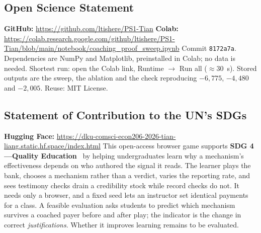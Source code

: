 {\small
\subsection*{Open Science Statement}
\textbf{GitHub:} \url{https://github.com/ltishere/PS1-Tian}\quad
\textbf{Colab:} \url{https://colab.research.google.com/github/ltishere/PS1-Tian/blob/main/notebook/coaching_proof_sweep.ipynb}\quad
Commit \texttt{8172a7a}. Dependencies are NumPy and Matplotlib,
preinstalled in Colab; no data is needed. Shortest run: open the Colab
link, Runtime $\rightarrow$ Run all ($\approx$30~s). Stored outputs are
the sweep, the ablation and the check reproducing $-6{,}775$, $-4{,}480$
and $-2{,}005$. Reuse: MIT License.

\subsection*{Statement of Contribution to the UN's SDGs}
\textbf{Hugging Face:}
\url{https://dku-comsci-econ206-2026-tian-liang.static.hf.space/index.html}\quad
This open-access browser game supports \textbf{SDG 4---Quality
Education}~\cite{un2015sdg4} by helping undergraduates learn why a
mechanism's effectiveness depends on who authored the signal it reads.
The learner plays the bank, chooses a mechanism rather than a verdict, varies
the reporting rate, and sees testimony checks drain a credibility stock
while record checks do not. It needs only a browser, and a fixed seed lets
an instructor set identical payments for a class. A feasible evaluation
asks students to predict which mechanism survives a coached payer before
and after play; the indicator is the change in correct
\emph{justifications}. Whether it improves learning remains to be
evaluated.
\par}
\balance